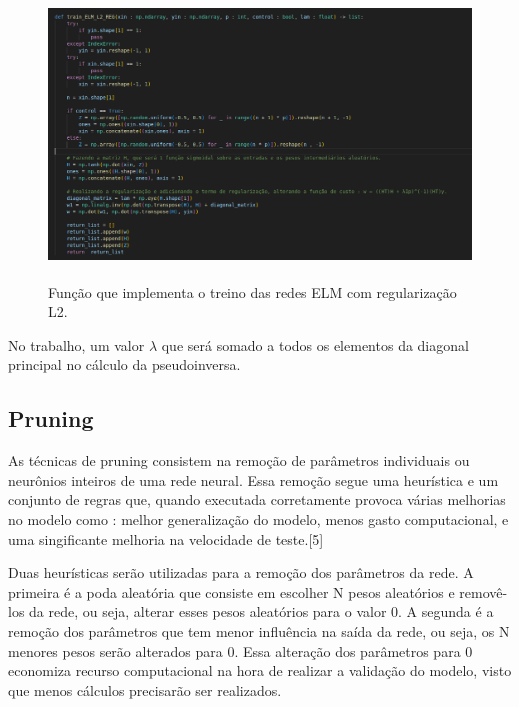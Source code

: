 \documentclass{article}
\begin{document}
\begin{figure}[h]

    \centering
    \includegraphics[height=3in]{train_L2.png}
    \caption{Função que implementa o treino das redes ELM com regularização L2.}
    \label{fig:example}
    
\end{figure}

\vspace{15pt}

No trabalho, um valor $\lambda$ que será somado a todos os elementos da diagonal principal no cálculo da pseudoinversa.


\vspace{20pt}

\subsection*{Pruning}

\vspace{20pt}

As técnicas de pruning consistem na remoção de parâmetros individuais ou neurônios inteiros de uma rede neural. Essa remoção segue uma heurística e um conjunto de regras que, quando executada corretamente provoca várias melhorias no modelo como : melhor generalização do modelo, menos gasto computacional, e uma singificante melhoria na velocidade de teste.[5]

\vspace{15pt}

Duas heurísticas serão utilizadas para a remoção dos parâmetros da rede. A primeira é a poda aleatória que consiste em escolher N pesos aleatórios e removê-los da rede, ou seja, alterar esses pesos aleatórios para o valor 0.  A segunda é a remoção dos parâmetros que tem menor influência na saída da rede, ou seja, os N menores pesos serão alterados para 0. Essa alteração dos parâmetros para 0 economiza recurso computacional na hora de realizar a validação do modelo, visto que menos cálculos precisarão ser realizados.
\end{document}
